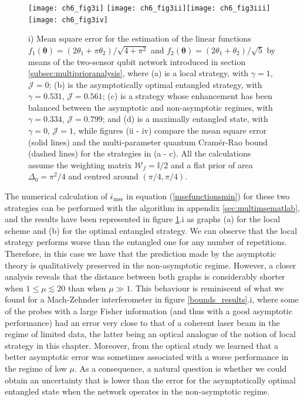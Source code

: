 \begin{figure}[t]
\centering
\texttt{[image: ch6\_fig3i]}
\texttt{[image: ch6\_fig3ii]}\texttt{[image: ch6\_fig3iii]}\texttt{[image: ch6\_fig3iv]}
\caption[Estimation of two linear functions in the non-asymptotic regime]{i) Mean square error for the estimation of the linear functions $f_1(\boldsymbol{\theta}) = (2\theta_1 + \pi \theta_2)/\sqrt{4+\pi^2}$ and $f_2(\boldsymbol{\theta}) = (2\theta_1 + \theta_2)/\sqrt{5}$ by means of the two-sensor qubit network introduced in section \ref{subsec:multiprioranalysis}, where (a) is a local strategy, with $\gamma = 1$, $\mathcal{J} = 0$; (b) is the asymptotically optimal entangled strategy, with $\gamma = 0.531$, $\mathcal{J} = 0.561$; (c) is a strategy whose enhancement has been balanced between the asymptotic and non-asymptotic regimes, with $\gamma = 0.334$, $\mathcal{J} = 0.799$; and (d) is a maximally entangled state, with $\gamma = 0$, $\mathcal{J} = 1$, while figures (ii - iv) compare the mean square error (solid lines) and the multi-parameter quantum Cram\'{e}r-Rao bound (dashed lines) for the strategies in (a - c). All the calculations assume the weighting matrix $\mathcal{W}_f = \mathbb{I}/2$ and a flat prior  of area $\Delta_0 = \pi^2/4$ and centred around $(\pi/4, \pi/4)$.}
\label{nonasymptoticnetwork}
\end{figure}

The numerical calculation of $\bar{\epsilon}_{\mathrm{mse}}$ in equation (\ref{msefunctionsmin}) for these two strategies can be performed with the algorithm in appendix \ref{sec:multimsematlab}, and the results have been represented in figure \ref{nonasymptoticnetwork}.i as graphs (a) for the local scheme and (b) for the optimal entangled strategy. We can observe that the local strategy performs worse than the entangled one for any number of repetitions. Therefore, in this case we have that the prediction made by the asymptotic theory is qualitatively preserved in the non-asymptotic regime. However, a closer analysis reveals that the distance between both graphs is considerably shorter when $1 \leqslant \mu \lesssim 20$ than when $\mu \gg 1$. This behaviour is reminiscent of what we found for a Mach-Zehnder interferometer in figure \ref{bounds_results}.i, where some of the probes with a large Fisher information (and thus with a good asymptotic performance) had an error very close to that of a coherent laser beam in the regime of limited data, the latter being an optical analogue of the notion of local strategy in this chapter. Moreover, from the optical study we learned that a better asymptotic error was sometimes associated with a worse performance in the regime of low $\mu$. As a consequence, a natural question is whether we could obtain an uncertainty that is lower than the error for the asymptotically optimal entangled state when the network operates in the non-asymptotic regime. 

